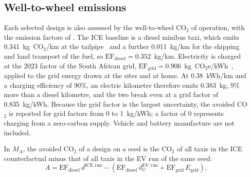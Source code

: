\documentclass{elsarticle}
\newcommand{\MA}{\ensuremath{M_A}}
\begin{document}
\subsection{Well-to-wheel emissions}
\label{sec:emissions_method}

Each selected design is also assessed by the well-to-wheel CO$_2$ of operation, with the emission factors of \citet{sello2026_embt_in_cpt}. The ICE baseline is a diesel minibus taxi, which emits 0.341~kg~CO$_2$/km at the tailpipe~\cite{kornelius2022_fuel_emissions} and a further 0.011~kg/km for the shipping and land transport of the fuel, so \(\mathrm{EF}_\mathrm{diesel} = 0.352\)~kg/km. Electricity is charged at the 2023 factor of the South African grid, \(\mathrm{EF}_\mathrm{grid} = 0.906\)~kg~CO$_2$e/kWh~\cite{dffe2025_south_africa_grid_emission_factors}, applied to the grid energy drawn at the sites and at home. At 0.38~kWh/km and a charging efficiency of 90\%, an electric kilometre therefore emits 0.383~kg, 9\% more than a diesel kilometre, and the two break even at a grid factor of 0.835~kg/kWh. Because the grid factor is the largest uncertainty, the avoided CO$_2$ is reported for grid factors from 0 to 1~kg/kWh; a factor of 0 represents charging from a zero-carbon supply. Vehicle and battery manufacture are not included.

In \(\MA\), the avoided CO$_2$ of a design on a seed is the CO$_2$ of all taxis in the ICE counterfactual minus that of all taxis in the EV run of the same seed:
\begin{equation}
    A = \mathrm{EF}_\mathrm{diesel}\, d^{\text{ICE run}} - \left(\mathrm{EF}_\mathrm{diesel}\, d_\mathrm{C}^{\text{EV run}} + \mathrm{EF}_\mathrm{grid}\, E_\mathrm{grid}\right),
    \label{eq:avoided_co2}
\end{equation}
\end{document}
